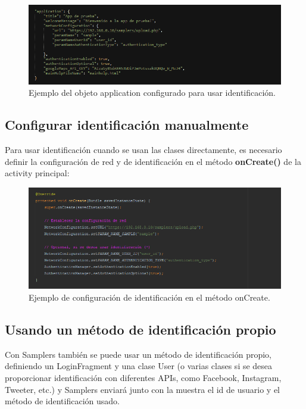 \begin{figure}[H]
  \centering
    \includegraphics[scale=0.6]{50-anexos/B-uso/identificacion.png} 
    \caption{Ejemplo del objeto application configurado para usar identificación.}
\end{figure}	


\subsection{Configurar identificación manualmente} \label{sec:identificacion_manual}

Para usar identificación cuando se usan las clases directamente, es necesario definir la configuración de red y de identificación en el método \textbf{onCreate()} de la activity principal:

\begin{figure}[H]
  \centering
    \includegraphics[scale=0.6]{50-anexos/B-uso/identificacion_manual.png} 
    \caption{Ejemplo de configuración de identificación en el método onCreate.}
\end{figure}	


\subsection{Usando un método de identificación propio} \label{sec:usar_auth_propia}

Con Samplers también se puede usar un método de identificación propio, definiendo un LoginFragment y una clase User (o varias clases si se desea proporcionar identificación con diferentes APIs, como Facebook, Instagram, Tweeter, etc.) y Samplers enviará junto con la muestra el id de usuario y el método de identificación usado.



